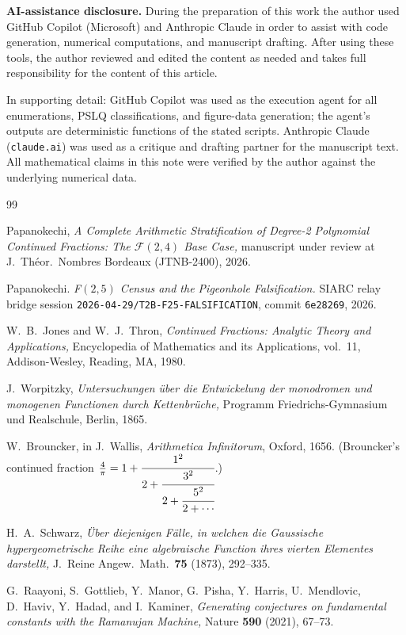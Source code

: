 \documentclass[11pt]{amsart}
\theoremstyle{definition}
\theoremstyle{remark}
\newcommand{\FF}{\mathcal{F}}
\begin{document}
\textbf{AI-assistance disclosure.}  During the preparation of this
work the author used GitHub Copilot (Microsoft) and Anthropic Claude
in order to assist with code generation, numerical computations,
and manuscript drafting. After using these tools, the author
reviewed and edited the content as needed and takes full
responsibility for the content of this article.

In supporting detail: GitHub Copilot was used as the execution
agent for all enumerations, PSLQ classifications, and figure-data
generation; the agent's outputs are deterministic functions of the
stated scripts.  Anthropic Claude (\texttt{claude.ai}) was used as a
critique and drafting partner for the manuscript text.  All
mathematical claims in this note were verified by the author against
the underlying numerical data.

\begin{thebibliography}{99}

Papanokechi,
\emph{A Complete Arithmetic Stratification of Degree-2 Polynomial
Continued Fractions: The $\FF(2,4)$ Base Case,}
manuscript under review at J.~Th\'{e}or.\ Nombres Bordeaux
(JTNB-2400), 2026.

Papanokechi.
\emph{F$(2,5)$ Census and the Pigeonhole Falsification.}
SIARC relay bridge session
\texttt{2026-04-29/T2B-F25-FALSIFICATION}, commit \texttt{6e28269},
2026.

W.~B.~Jones and W.~J.~Thron,
\emph{Continued Fractions: Analytic Theory and Applications,}
Encyclopedia of Mathematics and its Applications, vol.~11,
Addison-Wesley, Reading, MA, 1980.

J.~Worpitzky,
\emph{Untersuchungen \"uber die Entwickelung der monodromen und
monogenen Functionen durch Kettenbr\"uche,}
Programm Friedrichs-Gymnasium und Realschule, Berlin, 1865.

W.~Brouncker, in J.~Wallis,
\emph{Arithmetica Infinitorum}, Oxford, 1656.
(Brouncker's continued fraction $\tfrac{4}{\pi}
= 1 + \cfrac{1^2}{2 + \cfrac{3^2}{2 + \cfrac{5^2}{2+\cdots}}}$.)

H.~A.~Schwarz,
\emph{\"Uber diejenigen F\"alle, in welchen die Gauss\-ische
hypergeometrische Reihe eine algebraische Function ihres vierten
Elementes darstellt,}
J.\ Reine Angew.\ Math.\ \textbf{75} (1873), 292--335.

G.~Raayoni, S.~Gottlieb, Y.~Manor, G.~Pisha, Y.~Harris, U.~Mendlovic,
D.~Haviv, Y.~Hadad, and I.~Kaminer,
\emph{Generating conjectures on fundamental constants with the
Ramanujan Machine,}
Nature \textbf{590} (2021), 67--73.

\end{thebibliography}
\end{document}

